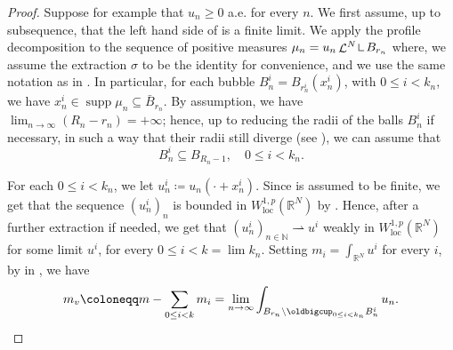 \documentclass[JEP,XML,SOM,Unicode,published]{cedram}
\theoremstyle{plain}
\theoremstyle{definition}
\newcommand{\N}{\mathbb{N}}
\newcommand{\R}{\mathbb{R}}
\newcommand{\mres}{\mathop{\hbox{\vrule height 6pt width .5pt depth 0pt \vrule height .5pt width 4pt depth 0pt}}\nolimits}
\newcommand{\loc}{\mathrm{loc}}
\DeclareMathOperator{\supp}{supp}
\DeclareMathOperator{\lbm}{\mathcal{L}}
\newcommand{\weakto}{\rightharpoonup}
\begin{document}
\begin{proof}
Suppose for example that $u_n \geq 0$ a.e. for every $n$. We first assume, up to subsequence, that the left hand side of  is a finite limit. We apply the profile decomposition  to the sequence of positive measures \(\mu_n=u_n \lbm^N \mres B_{r_n}\) where, we assume the extraction \(\sigma\) to be the identity for convenience, and we use the same notation as in . In particular, for each bubble \(B^i_n=B_{r^i_n}(x^i_n)\), with \(0\leq i<k_n\), we have \(x^i_n\in\supp\mu_n\subseteq \bar B_{r_n}\). By assumption, we have \(\lim_{n\to\infty}(R_n-r_n)=+\infty\); hence, up to reducing the radii of the balls \(B^i_n\) if necessary, in such a way that their radii still diverge (see ), we can assume that
\begin{equation}
\label{bubbleStrongInclusion}
B^i_n\subseteq B_{R_n-1},\quad 0\leq i<k_n.
\end{equation}

For each \(0\leq i<k_n\), we let \(u^i_n\coloneqq u_n(\cdot+x^i_n)\). Since  is assumed to be finite, we get that the sequence \((u^i_n)_n\) is bounded in \(W^{1,p}_\loc(\R^N)\) by . Hence, after a further extraction if needed, we get that \((u^i_n)_{n\in\N}\weakto u^i\) weakly in \(W^{1,p}_\loc(\R^N)\) for some limit \(u^i\), for every \(0\leq i<k=\lim k_n\). Setting \(m_i=\int_{\R^N}u^i\) for every $i$, by  in , we have
\[
m_v\coloneqq m-\sum_{0\leq i<k}m_i=\lim_{n\to\infty}\int_{B_{r_n}\setminus\oldbigcup_{0\leq i<k_n}B^i_n}u_n.
\]


\end{proof}
\end{document}
